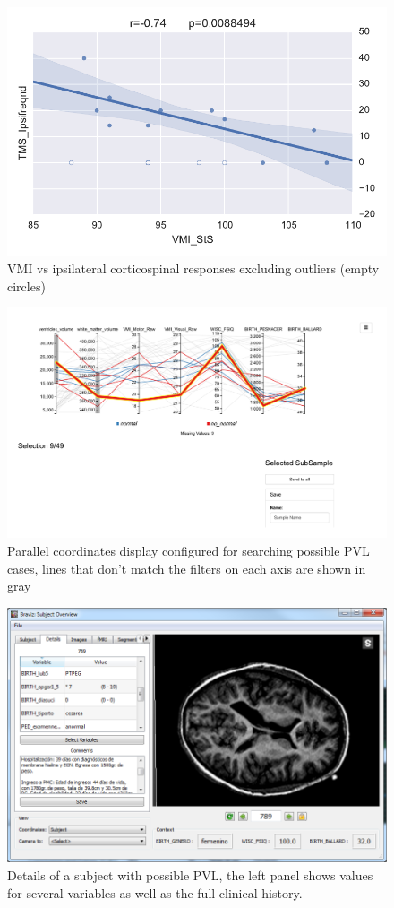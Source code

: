 \documentclass{frontiersHLTH}
\begin{document}
\begin{figure}
	\centering
		\includegraphics[width=0.9\linewidth]{corr_cyril_2}
	\caption{VMI vs ipsilateral corticospinal responses excluding outliers (empty circles)}
	\label{fig_cyril_5}
\end{figure}

\begin{figure}
\begin{center}
\includegraphics[width=\linewidth,trim = 30mm 90mm 60mm 10mm ,clip]{parallel_coordinates_raw}
\end{center}
 \caption{\label{fig_parallel}Parallel coordinates display configured for searching possible PVL cases, lines that don't match the filters on each axis are shown in gray}
\end{figure}


\begin{figure}
\begin{center}
\includegraphics[width=\linewidth]{pvl_details}
\end{center}
 \caption{\label{fig_subject3}Details of a subject with possible PVL, the left panel shows values for several variables as well as the full clinical history.}
\end{figure}
\end{document}
